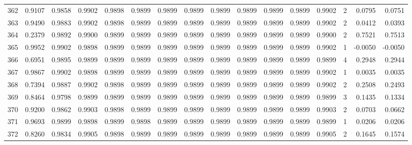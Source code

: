 \begin{tabular}{lrrrrrrrrrrrrrrr}
362 &      0.9107 &  0.9858 &  0.9902 &  0.9898 &  0.9899 &  0.9899 &  0.9899 &  0.9899 &  0.9899 &  0.9899 &   0.9899 &     0.9902 &      2 &                    0.0795 &                     0.0751 \\
363 &      0.9490 &  0.9883 &  0.9902 &  0.9898 &  0.9899 &  0.9899 &  0.9899 &  0.9899 &  0.9899 &  0.9899 &   0.9899 &     0.9902 &      2 &                    0.0412 &                     0.0393 \\
364 &      0.2379 &  0.9892 &  0.9900 &  0.9899 &  0.9899 &  0.9899 &  0.9899 &  0.9899 &  0.9899 &  0.9899 &   0.9899 &     0.9900 &      2 &                    0.7521 &                     0.7513 \\
365 &      0.9952 &  0.9902 &  0.9898 &  0.9899 &  0.9899 &  0.9899 &  0.9899 &  0.9899 &  0.9899 &  0.9899 &   0.9899 &     0.9902 &      1 &                   -0.0050 &                    -0.0050 \\
366 &      0.6951 &  0.9895 &  0.9899 &  0.9899 &  0.9899 &  0.9899 &  0.9899 &  0.9899 &  0.9899 &  0.9899 &   0.9899 &     0.9899 &      4 &                    0.2948 &                     0.2944 \\
367 &      0.9867 &  0.9902 &  0.9898 &  0.9899 &  0.9899 &  0.9899 &  0.9899 &  0.9899 &  0.9899 &  0.9899 &   0.9899 &     0.9902 &      1 &                    0.0035 &                     0.0035 \\
368 &      0.7394 &  0.9887 &  0.9902 &  0.9898 &  0.9899 &  0.9899 &  0.9899 &  0.9899 &  0.9899 &  0.9899 &   0.9899 &     0.9902 &      2 &                    0.2508 &                     0.2493 \\
369 &      0.8464 &  0.9798 &  0.9899 &  0.9899 &  0.9899 &  0.9899 &  0.9899 &  0.9899 &  0.9899 &  0.9899 &   0.9899 &     0.9899 &      3 &                    0.1435 &                     0.1334 \\
370 &      0.9200 &  0.9862 &  0.9903 &  0.9898 &  0.9899 &  0.9899 &  0.9899 &  0.9899 &  0.9899 &  0.9899 &   0.9899 &     0.9903 &      2 &                    0.0703 &                     0.0662 \\
371 &      0.9693 &  0.9899 &  0.9898 &  0.9899 &  0.9898 &  0.9899 &  0.9899 &  0.9899 &  0.9899 &  0.9899 &   0.9899 &     0.9899 &      1 &                    0.0206 &                     0.0206 \\
372 &      0.8260 &  0.9834 &  0.9905 &  0.9898 &  0.9899 &  0.9899 &  0.9899 &  0.9899 &  0.9899 &  0.9899 &   0.9899 &     0.9905 &      2 &                    0.1645 &                     0.1574 \\

\end{tabular}
